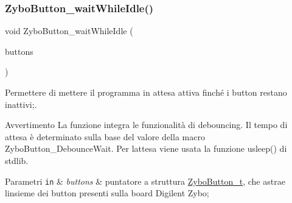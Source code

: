 \subsubsection{\texorpdfstring{Zybo\+Button\+\_\+wait\+While\+Idle()}{ZyboButton\_waitWhileIdle()}}
{\footnotesize\ttfamily void Zybo\+Button\+\_\+wait\+While\+Idle (\begin{DoxyParamCaption}\item[{\hyperlink{struct_zybo_button__t}{Zybo\+Button\+\_\+t} $\ast$}]{buttons }\end{DoxyParamCaption})}



Permettere di mettere il programma in attesa attiva finché i button restano inattivi;. 

\begin{DoxyWarning}{Avvertimento}
La funzione integra le funzionalità di debouncing. Il tempo di attesa è determinato sulla base del valore della macro Zybo\+Button\+\_\+\+Debounce\+Wait. Per l\textquotesingle{}attesa viene usata la funzione usleep() di stdlib.
\end{DoxyWarning}

\begin{DoxyParams}[1]{Parametri}
\mbox{\tt in}  & {\em buttons} & puntatore a struttura \hyperlink{struct_zybo_button__t}{Zybo\+Button\+\_\+t}, che astrae l\textquotesingle{}insieme dei button presenti sulla board Digilent Zybo;\\
\hline
\end{DoxyParams}

